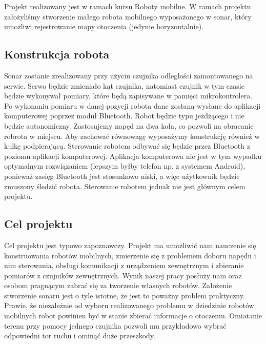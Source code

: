 Projekt realizowany jest w ramach kursu Roboty mobilne. W ramach projektu założyliśmy stworzenie małego robota mobilnego wyposażonego w sonar, który umożliwi rejestrowanie mapy otoczenia (jedynie horyzontalnie).
\subsection{Konstrukcja robota}
Sonar zostanie zrealizowany przy użyciu czujnika odległości zamontowanego na serwie. Serwo będzie zmieniało kąt czujnika, natomiast czujnik w tym czasie będzie wykonywał pomiary, które będą zapisywane w pamięci mikrokontrolera. Po wykonaniu pomiaru w danej pozycji robota dane zostaną wysłane do aplikacji komputerowej poprzez moduł Bluetooth. \newline 
Robot będzie typu jeżdżącego i nie będzie autonomiczny. Zastosujemy napęd na dwa koła, co pozwoli na obracanie robrota w miejscu. Aby zachować równowagę wyposażymy konstrukcję również w kulkę podpierającą. Sterowanie robotem odbywać się będzie przez Bluetooth z poziomu aplikacji komputerowej. Aplikacja komputerowa nie jest w tym wypadku optymalnym rozwiązaniem (lepszym byłby telefon np. z systemem Android), ponieważ zasięg Bluetooth jest stosunkowo niski, a więc użytkownik będzie zmuszony śledzić robota. Sterowanie robotem jednak nie jest głównym celem projektu.
\subsection{Cel projektu}
Cel projektu jest typowo zapoznawczy. Projekt ma umożliwić nam nauczenie się konstruowania robotów mobilnych, zmierzenie się z problemem doboru napędu i nim sterowania, obsługi komunikacji z urządzeniem zewnętrznym i zbieranie pomiarów z czujników zewnętrznych. Wynik naszej pracy posłuży nam oraz osobom pragnącym zabrać się za tworzenie własnych robotów. \newline
Założenie stworzenie sonaru jest o tyle istotne, że jest to poważny problem praktyczny. Prawie, że niezależnie od wyboru realizowanego problemu w dziedzinie robotów mobilnych robot powinien być w stanie zbierać informacje o otoczeniu. Omiatanie terenu przy pomocy jednego czujnika pozwoli mu przykładowo wybrać odpowiedni tor ruchu i ominąć duże przeszkody. 

